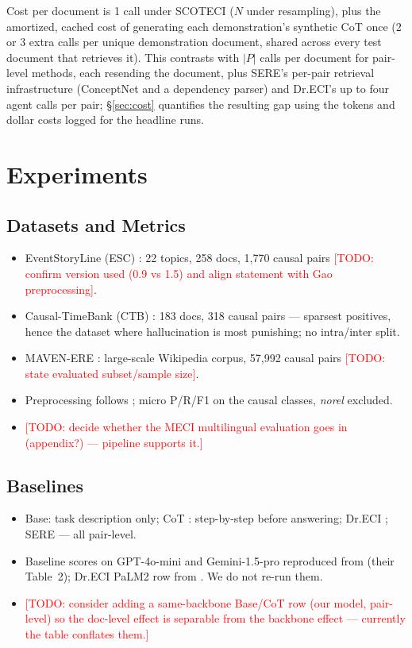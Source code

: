 \documentclass[11pt]{article}
\newcommand{\todo}[1]{\textcolor{red}{[TODO: #1]}}
\newcommand{\method}{SCOTECI}
\begin{document}
Cost per document is 1 call under \method{} ($N$ under resampling), plus the
amortized, cached cost of generating each demonstration's synthetic CoT once (2 or
3 extra calls per unique demonstration document, shared across every test document
that retrieves it). This contrasts with $|P|$ calls per document for pair-level
methods, each resending the document, plus SERE's per-pair retrieval
infrastructure (ConceptNet and a dependency parser) and Dr.ECI's up to four agent
calls per pair; \S\ref{sec:cost} quantifies the resulting gap using the tokens and
dollar costs logged for the headline runs.

\section{Experiments}
\label{sec:experiments}

\subsection{Datasets and Metrics}
\begin{itemize}
  \item EventStoryLine (ESC) \citep{caselli2017event}: 22 topics, 258 docs,
        1{,}770 causal pairs \todo{confirm version used (0.9 vs 1.5) and align
        statement with Gao preprocessing}.
  \item Causal-TimeBank (CTB) \citep{mirza2014annotating}: 183 docs, 318 causal
        pairs --- sparsest positives, hence the dataset where hallucination is
        most punishing; no intra/inter split.
  \item MAVEN-ERE \citep{wang2022mavenere}: large-scale Wikipedia corpus,
        57{,}992 causal pairs \todo{state evaluated subset/sample size}.
  \item Preprocessing follows \citet{gao2023chatgpt}; micro P/R/F1 on the causal
        classes, \textit{norel} excluded.
  \item \todo{decide whether the MECI multilingual evaluation
        \citep{lai2022meci} goes in (appendix?) --- pipeline supports it.}
\end{itemize}

\subsection{Baselines}
\begin{itemize}
  \item Base: task description only; CoT \citep{wei2022chain}: step-by-step
        before answering; Dr.ECI \citep{cai2025dreci}; SERE \citep{hao2026sere}
        --- all pair-level.
  \item Baseline scores on GPT-4o-mini and Gemini-1.5-pro reproduced from
        \citet{hao2026sere} (their Table~2); Dr.ECI PaLM2 row from
        \citet{cai2025dreci}. We do not re-run them.
  \item \todo{consider adding a same-backbone Base/CoT row (our model,
        pair-level) so the doc-level effect is separable from the backbone
        effect --- currently the table conflates them.}
\end{itemize}
\end{document}
